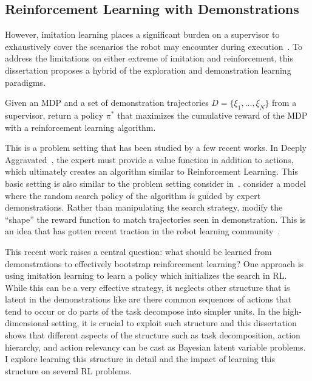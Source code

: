 \subsection{Reinforcement Learning with Demonstrations}
However, imitation learning places a significant burden on a supervisor to exhaustively cover the scenarios the robot may encounter during execution~\cite{laskey2017iterative}.
To address the limitations on either extreme of imitation and reinforcement, this dissertation proposes a hybrid of the exploration and demonstration learning paradigms. 

\begin{problem}
Given an MDP and a set of demonstration trajectories $D = \{\xi_1,...,\xi_N\}$ from a supervisor, return a policy $\pi^*$ that maximizes the cumulative reward of the MDP with a reinforcement learning algorithm.
\end{problem}

This is a problem setting that has been studied by a few recent works.
In Deeply Aggravated~\cite{sun2017deeply},  the expert must provide a value function in addition to actions, which ultimately creates an algorithm similar to Reinforcement Learning.
This basic setting is also similar to the problem setting consider in~\cite{piot2014boosted}.
\cite{subramanian2016exploration} consider a model where the random search policy of the algorithm is guided by expert demonstrations.
Rather than manipulating the search strategy, \cite{brys2015reinforcement} modify the ``shape'' the reward function to match trajectories seen in demonstration.
This is an idea that has gotten recent traction in the robot learning community~\cite{duan2017one, james2017transferring, hester2017deep}. 

This recent work raises a central question: what should be learned from demonstrations to effectively bootstrap reinforcement learning?
One approach is using imitation learning to learn a policy which initializes the search in RL.
While this can be a very effective strategy, it neglects other structure that is latent in the demonstrations like are there common sequences of actions that tend to occur or do parts of the task decompose into simpler units.
In the high-dimensional setting, it is crucial to exploit such structure and this dissertation shows that different aspects of the structure such as task decomposition, action hierarchy, and action relevancy can be cast as Bayesian latent variable problems. I explore learning this structure in detail and the impact of learning this structure on several RL problems. 




